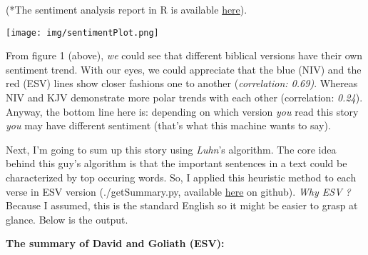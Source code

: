 \documentclass{article}
\begin{document}
\begin{multicols}{2}
(*The sentiment analysis report in R is available \href{https://www.dropbox.com/s/q70ip7zgxobbmvt/sentimentPlot.pdf}{here}).

\bigskip
\noindent
\begin{minipage}{\linewidth}
    \centering
    \texttt{[image: img/sentimentPlot.png]}

\end{minipage}

\end{multicols}  
\newpage

\begin{multicols}{2}
From figure 1 (above), \textit{we} could see that different biblical versions have their own sentiment trend. 
With our eyes, we could appreciate that the blue (NIV) and the red (ESV) lines show closer fashions one to another (\textit{correlation: 0.69)}. 
Whereas NIV and KJV demonstrate more polar trends with each other (correlation: \textit{0.24}). 
Anyway, the bottom line here is: depending on which version \textit{you} read this story \textit{you} may have different sentiment (that's what this machine wants to say).

Next, I'm going to sum up this story using \textit{Luhn}'s algorithm. 
The core idea behind this guy's algorithm is that the important sentences in a text could be characterized by top occuring words. 
So, I applied this heuristic method to each verse in ESV version (./getSummary.py, available \href{https://github.com/rickylim19/DavidGoliath}{here} on github). 
\textit{Why ESV ?} Because I assumed, this is the standard English so it might be easier to grasp at glance. 
Below is the output.

\textbf{The summary of David and Goliath (ESV):}

\end{multicols}  
\end{document}
